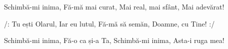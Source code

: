 \beginverse
Schimbă-mi inima,
Fă-mă mai curat,
Mai real, mai sfânt,
Mai adevărat!
\endverse

\beginchorus
/: Tu ești Olarul,
Iar eu lutul,
Fă-mă să semăn,
Doamne, cu Tine! :/
\endchorus

\beginverse
Schimbă-mi inima,
Fă-o ca și-a Ta,
Schimbă-mi inima,
Asta-i ruga mea!
\endverse
\endsong